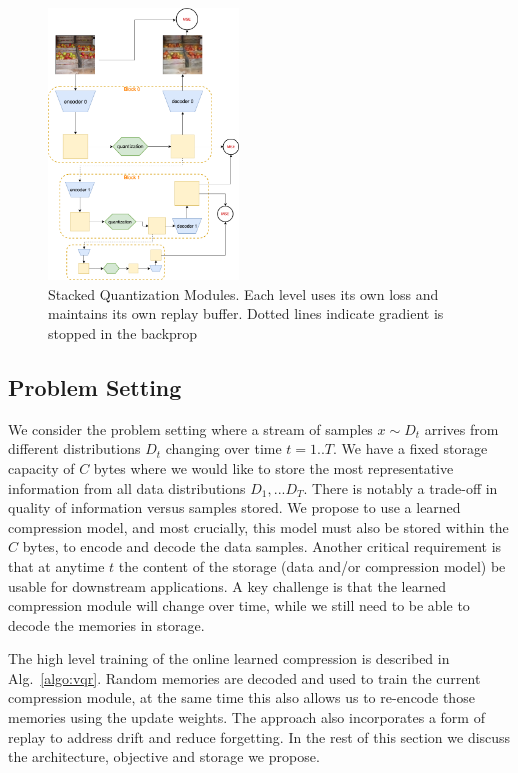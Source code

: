 \documentclass[colorinlistoftodos]{article} %
\begin{document}
\begin{figure}
    \centering
    \includegraphics[width=0.45\textwidth]{figs/sqm_cartoon.png}
    \caption{Stacked Quantization Modules. Each level uses its own loss and maintains its own replay buffer. Dotted lines indicate gradient is stopped in the backprop}
    \label{fig:soft_modules}
\end{figure}

\subsection{Problem Setting}
We consider the problem setting where a stream of samples $x \sim D_t$ arrives from different distributions $D_t$ changing over time $t=1..T$. We have a fixed storage capacity of $C$ bytes where we would like to store the most representative information from all data distributions $D_1,...D_T$. There is notably a trade-off in quality of information versus samples stored. We propose to use a learned compression model, and most crucially, this  model must also be stored within the $C$ bytes, to encode and decode the data samples. 
Another critical requirement is that at anytime $t$ the content of the storage (data and/or compression model) be usable for downstream applications.
A key challenge is that the learned compression module will change over time, while we still need to be able to decode the memories in storage. 

The high level training of the online learned compression is described in Alg.~\ref{algo:vqr}. Random memories are decoded and used to train the current compression module, at the same time this also allows us to re-encode those memories using the update weights.  The approach also incorporates a form of replay to address drift and reduce forgetting.  In the rest of this section we discuss the architecture, objective and storage we propose. 
\end{document}
